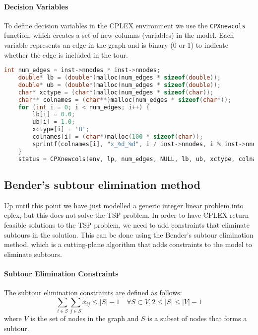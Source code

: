 \documentclass{article}
\begin{document}
\paragraph{Decision Variables}
To define decision variables in the CPLEX environment we use the \texttt{CPXnewcols} function, which creates a set of new columns (variables) in the model.
Each variable represents an edge in the graph and is binary (0 or 1) to indicate whether the edge is included in the tour.
\begin{lstlisting}[language=C]
	int num_edges = inst->nnodes * inst->nnodes;
	double* lb = (double*)malloc(num_edges * sizeof(double));
	double* ub = (double*)malloc(num_edges * sizeof(double));
	char* xctype = (char*)malloc(num_edges * sizeof(char));
	char** colnames = (char**)malloc(num_edges * sizeof(char*));
	for (int i = 0; i < num_edges; i++) {
		lb[i] = 0.0;
		ub[i] = 1.0;
		xctype[i] = 'B';
		colnames[i] = (char*)malloc(100 * sizeof(char));
		sprintf(colnames[i], "x_%d_%d", i / inst->nnodes, i % inst->nnodes);
	}
	status = CPXnewcols(env, lp, num_edges, NULL, lb, ub, xctype, colnames);
\end{lstlisting}

\subsection{Bender's subtour elimination method} 
Up until this point we have just modelled a generic integer linear problem into cplex, but this does not solve the TSP problem.
In order to have CPLEX return feasible solutions to the TSP problem, we need to add constraints that eliminate subtours in the solution.
This can be done using the Bender's subtour elimination method, which is a cutting-plane algorithm that adds constraints to the model to eliminate subtours.

\paragraph{Subtour Elimination Constraints}
The subtour elimination constraints are defined as follows: 
\begin{equation}
	\sum_{i \in S} \sum_{j \in S} x_{ij} \leq |S| - 1 \quad \forall S \subset V, 2 \leq |S| \leq |V| - 1
\end{equation}
where $V$ is the set of nodes in the graph and $S$ is a subset of nodes that forms a subtour.
\end{document}
